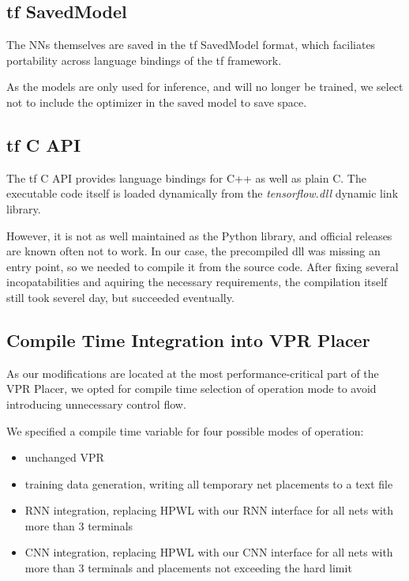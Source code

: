 \subsection{\gls{tf} SavedModel}

The \glspl{NN} themselves are saved in the \gls{tf} SavedModel format, which faciliates portability across language bindings of the \gls{tf} framework. 
	
As the models are only used for inference, and will no longer be trained, we select not to include the optimizer in the saved model to save space.

\subsection{\gls{tf} C API}

The \gls{tf} C API provides language bindings for C++ as well as plain C. The executable code itself is loaded dynamically from the \textit{tensorflow.dll} dynamic link library.

However, it is not as well maintained as the Python library, and official releases are known often not to work. In our case, the precompiled dll was missing an entry point, so we needed to compile it from the source code. After fixing several incopatabilities and aquiring the necessary requirements, the compilation itself still took severel day, but succeeded eventually.

\subsection{Compile Time Integration into \gls{VPR} Placer}

As our modifications are located at the most performance-critical part of the \gls{VPR} Placer, we opted for compile time selection of operation mode to avoid introducing unnecessary control flow. 

We specified a compile time variable for four possible modes of operation: 

\begin{itemize}
	\item unchanged \gls{VPR}
	\item training data generation, writing all temporary net placements to a text file
	\item \gls{RNN} integration, replacing \gls{HPWL} with our \gls{RNN} interface for all nets with more than 3 terminals
	\item \gls{CNN} integration, replacing \gls{HPWL} with our \gls{CNN} interface for all nets with more than 3 terminals and placements not exceeding the hard limit
\end{itemize}
